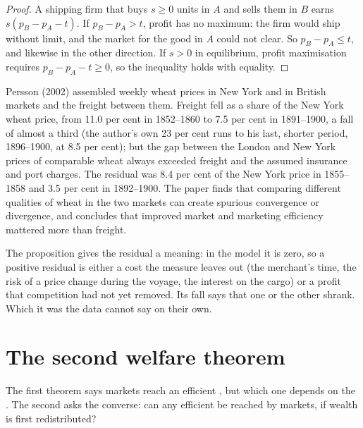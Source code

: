 \begin{proof}
A shipping firm that buys $s \ge 0$ units in $A$ and sells them in $B$ earns $s(p_B - p_A - t)$. If $p_B -
p_A > t$, profit has no maximum: the firm would ship without limit, and the market for the good in $A$
could not clear. So $p_B - p_A \le t$, and likewise in the other direction. If $s > 0$ in equilibrium,
profit maximisation requires $p_B - p_A - t \ge 0$, so the inequality holds with equality.
\end{proof}

\begin{record}
Persson (2002) assembled weekly wheat prices in New York and in British markets and the freight between
them. Freight fell as a share of the New York wheat price, from 11.0 per cent in 1852--1860 to 7.5 per cent
in 1891--1900, a fall of almost a third (the author's own 23 per cent runs to his last, shorter period, 1896--1900,
at 8.5 per cent); but the gap between the London and New York prices of comparable
wheat always exceeded freight and the assumed insurance and port charges. The residual was 8.4 per cent
of the New York price in 1855--1858 and 3.5 per cent in 1892--1900. The paper finds that comparing
different qualities of wheat in the two markets can create spurious convergence or divergence, and
concludes that improved market and marketing efficiency mattered more than freight.
\end{record}

The proposition gives the residual a meaning: in the model it is zero, so a positive residual is either a
cost the measure leaves out (the merchant's time, the risk of a price change during the voyage, the
interest on the cargo) or a profit that competition had not yet removed. Its fall says that one or the
other shrank. Which it was the data cannot say on their own.

\section{The second welfare theorem}\label{sec:b2:welfare-theorems:second}

The first theorem says markets reach an efficient , but which one depends on the .
The second asks the converse: can any efficient  be reached by markets, if wealth is first
redistributed?

